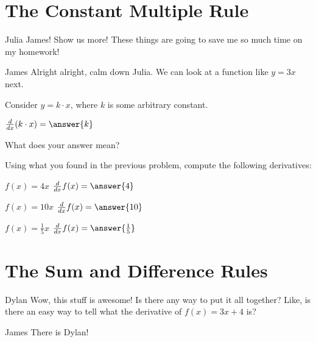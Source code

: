 \documentclass{ximera}
\begin{document}
\section{The Constant Multiple Rule}
\begin{dialogue}
\item[Julia] James! Show us more! These things are going to save me so much time on my homework!
\item[James] Alright alright, calm down Julia. We can look at a function like $y = 3x$ next.
\end{dialogue}

Consider $y = k \cdot x$, where $k$ is some arbitrary constant.
\begin{question}
$\frac{d}{dx} (k \cdot x) =  \answer{k}$

\item{What does your answer mean?}

\begin{freeResponse}

\end{freeResponse}
\end{question}

\begin{question}
\item{Using what you found in the previous problem, compute the following derivatives:}

$f(x) = 4x$ \hspace{12mm} $\frac{d}{dx} f(x) =  \answer{4}$

$f(x) = 10x$ \hspace{10mm} $\frac{d}{dx} f(x) =  \answer{10}$

$f(x) = \frac{1}{5}x$ \hspace{11mm} $\frac{d}{dx} f(x) =  \answer{\frac{1}{5}}$
\end{question}

\section{The Sum and Difference Rules}
\begin{dialogue}
\item[Dylan] Wow, this stuff is awesome! Is there any way to put it all together? Like, is there an easy way to tell what the derivative of $f(x) = 3x+4$ is?
\item[James] There is Dylan!
\end{dialogue}
\end{document}

